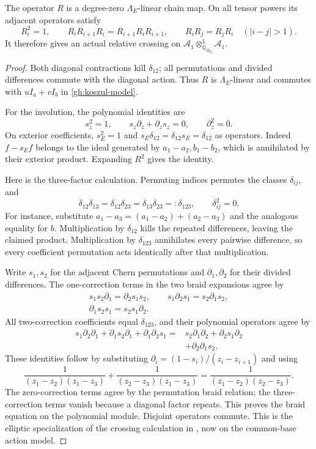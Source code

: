 \begin{proposition}\label{gh:R-identities}
The operator $R$ is a degree-zero $\Lambda_E$-linear chain map.
On all tensor powers its adjacent operators satisfy
\[
 R_i^2=1,\qquad
 R_iR_{i+1}R_i=R_{i+1}R_iR_{i+1},\qquad
 R_iR_j=R_jR_i\quad(|i-j|>1).
\]
It therefore gives an actual relative crossing on
$\mathcal A_1\otimes^{\mathbb L}_{\mathbb Q_{B_E}}\mathcal A_1$.
\end{proposition}
\begin{proof}
Both diagonal contractions kill $\delta_{12}$; all permutations
and divided differences commute with the diagonal action.
Thus $R$ is $\Lambda_E$-linear and commutes with
$uI_a+vI_b$ in \eqref{gh:koszul-model}.

For the involution, the polynomial identities are
\[
 s_z^2=1,\qquad s_z\partial_z+\partial_zs_z=0,\qquad
 \partial_z^2=0.
\]
On exterior coefficients,
$s_E^2=1$ and $s_E\delta_{12}=\delta_{12}s_E=\delta_{12}$ as
operators. Indeed $f-s_Ef$ belongs to the ideal generated by
$a_1-a_2,b_1-b_2$, which is annihilated by their exterior product.
Expanding $R^2$ gives the identity.

Here is the three-factor calculation. Permuting indices permutes
the classes $\delta_{ij}$, and
\[
 \delta_{12}\delta_{13}
 =\delta_{12}\delta_{23}
 =\delta_{13}\delta_{23}=:\delta_{123},\qquad
 \delta_{ij}^2=0.
\]
For instance, substitute
$a_1-a_3=(a_1-a_2)+(a_2-a_3)$ and the analogous equality for $b$.
Multiplication by $\delta_{12}$ kills the repeated differences,
leaving the claimed product. Multiplication by $\delta_{123}$
annihilates every pairwise difference, so every coefficient
permutation acts identically after that multiplication.

Write $s_1,s_2$ for the adjacent Chern permutations and
$\partial_1,\partial_2$ for their divided differences.
The one-correction terms in the two braid expansions agree by
\[
 \begin{gathered}
 s_1s_2\partial_1=\partial_2s_1s_2,\qquad
 s_1\partial_2s_1=s_2\partial_1s_2,\\
 \partial_1s_2s_1=s_2s_1\partial_2 .
 \end{gathered}
\]
All two-correction coefficients equal $\delta_{123}$, and their
polynomial operators agree by
\[
 \begin{split}
 s_1\partial_2\partial_1+\partial_1s_2\partial_1
                         +\partial_1\partial_2s_1
 ={}&s_2\partial_1\partial_2+\partial_2s_1\partial_2\\
    &+\partial_2\partial_1s_2 .
 \end{split}
\]
These identities follow by substituting
$\partial_i=(1-s_i)/(z_i-z_{i+1})$ and using
\[
 \frac1{(z_1-z_2)(z_1-z_3)}
 +\frac1{(z_2-z_3)(z_1-z_3)}
 =\frac1{(z_1-z_2)(z_2-z_3)}.
\]
The zero-correction terms agree by the permutation braid relation;
the three-correction terms vanish because a diagonal factor repeats.
This proves the braid equation on the polynomial module.
Disjoint operators commute. This is the elliptic specialization of
the crossing calculation in \cite[\S3.5]{JindalLim2026}, now on
the common-base action model.
\end{proof}

